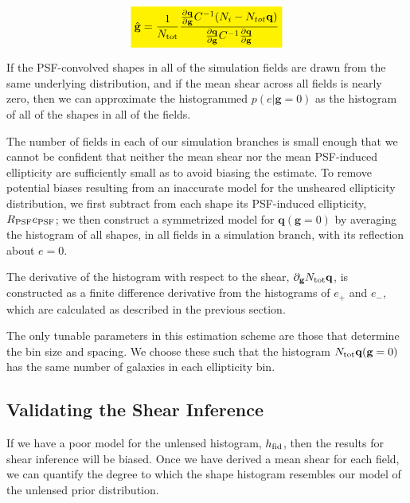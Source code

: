 \documentclass[iop]{emulateapj}
\newcommand\rmcomment[1]{\textcolor{red}{(RM: #1)}}
\newcommand{\mathcolorbox}[2]{\colorbox{#1}{$\displaystyle #2$}}
\begin{document}
\begin{align}
  \mathcolorbox{yellow}{\hat{\mathbf{g}} = \frac{1}{N_{\rm tot}}\frac{\frac{\partial \mathbf{q}}{\partial {\mathbf{g}}} C^{-1} (N_i -  N_{tot }\mathbf{q})}{\frac{\partial \mathbf{q}}{\partial {\mathbf{g}}} C^{-1} \frac{\partial \mathbf{q}}{\partial {\mathbf{g}}}}}
\label{eqn:mle}
\end{align}


If the PSF-convolved shapes in all of the simulation fields are drawn
from the same underlying distribution, and if the mean shear across
all fields is nearly zero, then we can approximate the histogrammed
$p(e|\mathbf{g}=0)$ as the histogram of all of the shapes in all of the
fields.

The number of fields in each of our simulation branches is small
enough that we cannot be confident that neither the mean shear nor the
mean PSF-induced ellipticity are sufficiently small as to avoid
biasing the estimate. To remove potential biases resulting from an
inaccurate model for the unsheared ellipticity distribution, we first
subtract from each shape its PSF-induced ellipticity,
$R_{\rm PSF}e_{\rm PSF}$; we then construct a symmetrized model for
$\mathbf{q}(\mathbf{g} = 0)$ by averaging the histogram of all shapes, in all
fields in a simulation branch, with its reflection about $e=0$.

The derivative of the histogram with respect to the shear,
$\partial_{\mathbf{g}} N_{\rm tot} \mathbf{q}$, is constructed as a finite difference
derivative from the histograms of $e_+$ and $e_-$, which are
calculated as described in the previous section.

The only tunable parameters in this estimation scheme are those that
determine the bin size and spacing. We choose these such that the
histogram $N_{\rm tot} \mathbf{q} (\mathbf{g}=0)$ has the same number
of galaxies in each ellipticity bin.


\subsection{Validating the Shear Inference}
\label{sec:model_checking}


If we have a poor model for the unlensed histogram, $h_{\rm fid}$,
then the results for shear inference will be biased. Once we have
derived a mean shear for each field, we can quantify the degree to
which the shape histogram resembles our model of the unlensed prior
distribution.
\end{document}
